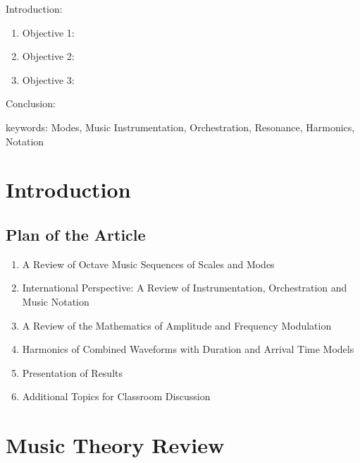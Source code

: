


\twocolumn
\scriptsize
\begin{frontmatter}
		\title{}
		\author{}
		\address{The Mathematical Learning Space}
\end{frontmatter}	

Introduction:
\begin{enumerate}
\item Objective 1:
\item Objective 2:
\item Objective 3:
\end{enumerate}
Conclusion:

keywords: Modes, Music Instrumentation, Orchestration, Resonance, Harmonics, Notation

\section{Introduction}


\subsection{Plan of the Article}

\begin{enumerate}
\item A Review of Octave Music Sequences of Scales and Modes 
\item International Perspective: A Review of Instrumentation, Orchestration and Music Notation
\item A Review of the Mathematics of Amplitude and Frequency Modulation
\item Harmonics of Combined Waveforms with Duration and Arrival Time Models 
\item Presentation of Results
\item Additional Topics for Classroom Discussion
\end{enumerate}

\section{Music Theory Review}

